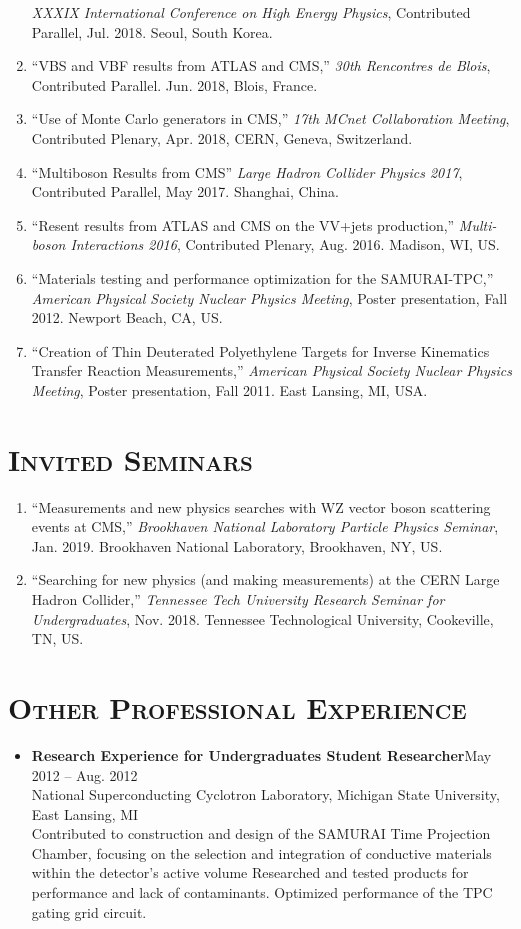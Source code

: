 \documentclass[10pt]{res} %
\begin{document}
\begin{resume}
\begin{enumerate}
    \emph{XXXIX International Conference on High Energy Physics}, Contributed Parallel, Jul. 2018. Seoul, South Korea.
  \item ``VBS and VBF results from ATLAS and CMS,''
    \emph{30th Rencontres de Blois}, Contributed Parallel. Jun. 2018, Blois, France.
  \item ``Use of Monte Carlo generators in CMS,'' 
    \emph{17th MCnet Collaboration Meeting}, Contributed Plenary, Apr. 2018, CERN, Geneva, Switzerland.
  \item ``Multiboson Results from CMS''
    \emph{Large Hadron Collider Physics 2017}, Contributed Parallel, May 2017. Shanghai, China.
  \item ``Resent results from ATLAS and CMS on the VV+jets production,''
    \emph{Multi-boson Interactions 2016}, Contributed Plenary, Aug. 2016. Madison, WI, US.
  \item ``Materials testing and performance optimization for the SAMURAI-TPC,''
    \emph{American Physical Society Nuclear Physics Meeting}, Poster presentation, Fall 2012. Newport Beach, CA, US.
  \item ``Creation of Thin Deuterated Polyethylene Targets for Inverse Kinematics Transfer Reaction Measurements,''
    \emph{American Physical Society Nuclear Physics Meeting}, Poster presentation, Fall 2011. East Lansing, MI, USA.
\end{enumerate}

\section{\textsc{Invited Seminars}}
\begin{enumerate}
 \item ``Measurements and new physics searches with WZ vector boson scattering events at CMS,''
     \emph{Brookhaven National Laboratory Particle Physics Seminar}, Jan. 2019. Brookhaven National Laboratory, Brookhaven, NY, US.
  \item ``Searching for new physics (and making measurements) at the CERN Large Hadron Collider,''
     \emph{Tennessee Tech University Research Seminar for Undergraduates}, Nov. 2018. Tennessee Technological University, Cookeville, TN, US.
\end{enumerate}

\section{\textsc{Other Professional Experience}}
\begin{itemize}
\item \textbf{Research Experience for Undergraduates Student Researcher}\hfill{May 2012 -- Aug. 2012} \\
National Superconducting Cyclotron Laboratory, Michigan State University, East Lansing, MI \\
Contributed to construction and design of the SAMURAI Time Projection Chamber,
focusing on the selection and integration of conductive materials within the detector's active volume
Researched and tested products for performance and lack 
of contaminants. Optimized performance of the TPC gating grid circuit.


\end{itemize}
\end{resume}
\end{document}
